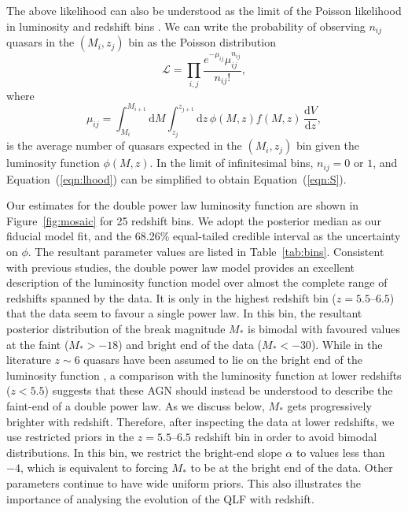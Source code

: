 \documentclass[fleqn,usenatbib]{mnras}
\begin{document}
The above likelihood can also be understood as the limit of the
Poisson likelihood in luminosity and redshift bins
\citep{1983ApJ...269...35M, 2001AJ....121...54F}.  We can write the
probability of observing $n_{ij}$ quasars in the $(M_i, z_j)$ bin as
the Poisson distribution
\begin{equation}
  \mathcal{L}=\prod_{i,j}\frac{e^{-\mu_{ij}}\mu_{ij}^{n_{ij}}}{n_{ij}!},
  \label{eqn:lhood}
\end{equation}
where 
\begin{equation}
  \mu_{ij}= \int_{M_i}^{M_{i+1}}\mathrm{d}M\int_{z_j}^{z_{j+1}}\mathrm{d}z\, \phi(M,z) f(M, z)
  \,\frac{\mathrm{d}V}{\mathrm{d}z},
\end{equation}
is the average number of quasars expected in the $(M_i, z_j)$ bin
given the luminosity function $\phi(M,z)$.  In the limit of
infinitesimal bins, $n_{ij}=0$ or $1$, and Equation~(\ref{eqn:lhood})
can be simplified to obtain Equation~(\ref{eqn:S}).

Our estimates for the double power law luminosity function are shown
in Figure~\ref{fig:mosaic} for 25 redshift bins.  We adopt the
posterior median as our fiducial model fit, and the 68.26\%
equal-tailed credible interval as the uncertainty on $\phi$.  The
resultant parameter values are listed in Table~\ref{tab:bins}.
Consistent with previous studies, the double power law model provides
an excellent description of the luminosity function model over almost
the complete range of redshifts spanned by the data.  It is only in
the highest redshift bin ($z=5.5$--$6.5$) that the data seem to favour
a single power law.  In this bin, the resultant posterior distribution
of the break magnitude $M_*$ is bimodal with favoured values at the
faint ($M_*>-18$) and bright end of the data ($M_*<-30$).  While in
the literature $z\sim 6$ quasars have been assumed to lie on the
bright end of the luminosity function
\citep[e.g.,][]{2016ApJ...833..222J}, a comparison with the luminosity
function at lower redshifts ($z<5.5$) suggests that these AGN should
instead be understood to describe the faint-end of a double power law.
As we discuss below, $M_*$ gets progressively brighter with redshift.
Therefore, after inspecting the data at lower redshifts, we use
restricted priors in the $z=5.5$--$6.5$ redshift bin in order to avoid
bimodal distributions.  In this bin, we restrict the bright-end slope
$\alpha$ to values less than $-4$, which is equivalent to forcing
$M_*$ to be at the bright end of the data.  Other parameters continue
to have wide uniform priors.  This also illustrates the importance of
analysing the evolution of the QLF with redshift.
\end{document}
